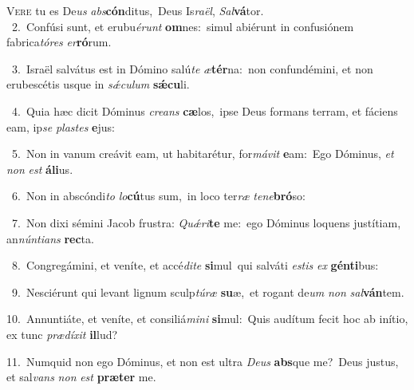 \lettrine{\initial\textcolor{\initialcolor}{V}}{ere} tu es De\textit{us} \textit{abs}\-\textbf{cón}ditus,~\star Deus Is\-\textit{ra}\-\textit{ël}, \textit{Sal}\-\textbf{vá}tor.\\
{\numbfont\textcolor{\numbcolor}{~2.}}~Confúsi sunt, et erubu\-\textit{é}\-\textit{runt} \textbf{om}\-nes:~\star simul abiérunt in confusiónem fabrica\-\textit{tó}\-\textit{res} \textit{er}\-\textbf{ró}rum.\par
{\numbfont\textcolor{\numbcolor}{~3.}}~Israël salvátus est in Dómino salú\textit{te} \textit{æ}\-\textbf{tér}na:~\star non confundémini, et non erubescétis usque in \textit{sǽ}\-\textit{cu}\textit{lum} \textbf{sǽ}\-\textbf{cu}li.\par
{\numbfont\textcolor{\numbcolor}{~4.}}~Quia hæc dicit Dóminus \textit{cre}\-\textit{ans} \textbf{cæ}\-los,~\star ipse Deus formans terram, et fáciens eam, ip\textit{se} \textit{plas}\-\textit{tes} \textbf{e}\-jus:\par
{\numbfont\textcolor{\numbcolor}{~5.}}~Non in vanum creávit eam, ut habitarétur, for\-\textit{má}\-\textit{vit} \textbf{e}\-am:~\star Ego Dóminus, \textit{et} \textit{non} \textit{est} \textbf{á}\-\textbf{li}us.\par
{\numbfont\textcolor{\numbcolor}{~6.}}~Non in abscóndi\textit{to} \textit{lo}\-\textbf{cú}tus sum,~\star in loco ter\textit{ræ} \textit{te}\-\textit{ne}\textbf{bró}so:\par
{\numbfont\textcolor{\numbcolor}{~7.}}~Non dixi sémini Jacob frustra: \textit{Quǽ}\-\textit{ri}\textbf{te} me:~\star ego Dóminus loquens justítiam, an\-\textit{nún}\-\textit{ti}\textit{ans} \textbf{rec}\-ta.\par
{\numbfont\textcolor{\numbcolor}{~8.}}~Congregámini, et veníte, et accé\-\textit{di}\-\textit{te} \textbf{si}\-mul~\star qui salváti \textit{es}\-\textit{tis} \textit{ex} \textbf{gén}\-\textbf{ti}bus:\par
{\numbfont\textcolor{\numbcolor}{~9.}}~Nesciérunt qui levant lignum sculp\-\textit{tú}\-\textit{ræ} \textbf{su}\-æ,~\star et rogant de\textit{um} \textit{non} \textit{sal}\-\textbf{ván}tem.\par
{\numbfont\textcolor{\numbcolor}{10.}}~Annuntiáte, et veníte, et consiliá\-\textit{mi}\-\textit{ni} \textbf{si}\-mul:~\star Quis audítum fecit hoc ab inítio, ex tunc \textit{præ}\-\textit{dí}\textit{xit} \textbf{il}\-lud?\par
{\numbfont\textcolor{\numbcolor}{11.}}~Numquid non ego Dóminus, et non est ultra \textit{De}\-\textit{us} \textbf{abs}\-que me?~\star Deus justus, et sal\textit{vans} \textit{non} \textit{est} \textbf{præ}\-\textbf{ter} me.\par
